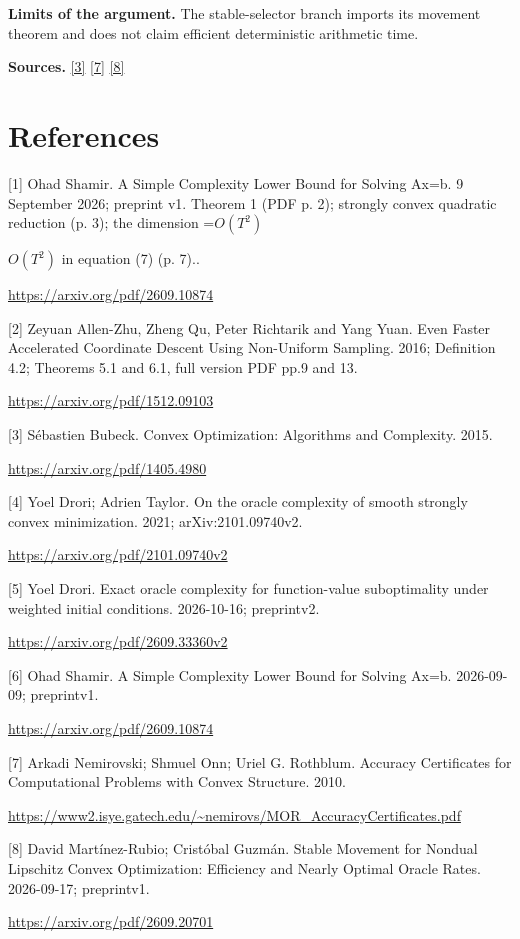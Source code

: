\documentclass[10pt,a4paper]{article}
\newcommand{\AtlasMath}[1]{\par\begingroup\centering\setbox0=\hbox{$\displaystyle #1$}\ifdim\wd0>1.4\linewidth\typeout{ATLAS WIDE FORMULA: \the\wd0}\fi\ifdim\wd0>\linewidth\resizebox{\linewidth}{!}{\box0}\else\box0\fi\par\endgroup}
\newcommand{\AtlasInlineMath}[1]{\begingroup\setbox0=\hbox{$#1$}\ifdim\wd0>.4\linewidth\endgroup\AtlasMath{#1}\else\endgroup$#1$\fi}
\begin{document}
\textbf{Limits of the argument.} The stable-selector branch imports its movement theorem and does not claim efficient deterministic arithmetic time.

\textbf{Sources.} \href{https://arxiv.org/pdf/1405.4980}{[3]} \href{https://www2.isye.gatech.edu/~nemirovs/MOR_AccuracyCertificates.pdf}{[7]} \href{https://arxiv.org/pdf/2609.20701}{[8]}

\section{References}
[1] Ohad Shamir. A Simple Complexity Lower Bound for Solving Ax=b. 9 September 2026; preprint v1. Theorem 1 (PDF p. 2); strongly convex quadratic reduction (p. 3); the dimension \AtlasInlineMath{O(T^2)} in equation (7) (p. 7)..

\url{https://arxiv.org/pdf/2609.10874}

[2] Zeyuan Allen-Zhu, Zheng Qu, Peter Richtarik and Yang Yuan. Even Faster Accelerated Coordinate Descent Using Non-Uniform Sampling. 2016; Definition 4.2; Theorems 5.1 and 6.1, full version PDF pp.9 and 13.

\url{https://arxiv.org/pdf/1512.09103}

[3] Sébastien Bubeck. Convex Optimization: Algorithms and Complexity. 2015.

\url{https://arxiv.org/pdf/1405.4980}

[4] Yoel Drori; Adrien Taylor. On the oracle complexity of smooth strongly convex minimization. 2021; arXiv:2101.09740v2.

\url{https://arxiv.org/pdf/2101.09740v2}

[5] Yoel Drori. Exact oracle complexity for function-value suboptimality under weighted initial conditions. 2026-10-16; preprintv2.

\url{https://arxiv.org/pdf/2609.33360v2}

[6] Ohad Shamir. A Simple Complexity Lower Bound for Solving Ax=b. 2026-09-09; preprintv1.

\url{https://arxiv.org/pdf/2609.10874}

[7] Arkadi Nemirovski; Shmuel Onn; Uriel G. Rothblum. Accuracy Certificates for Computational Problems with Convex Structure. 2010.

\url{https://www2.isye.gatech.edu/~nemirovs/MOR_AccuracyCertificates.pdf}

[8] David Martínez-Rubio; Cristóbal Guzmán. Stable Movement for Nondual Lipschitz Convex Optimization: Efficiency and Nearly Optimal Oracle Rates. 2026-09-17; preprintv1.

\url{https://arxiv.org/pdf/2609.20701}
\end{document}
